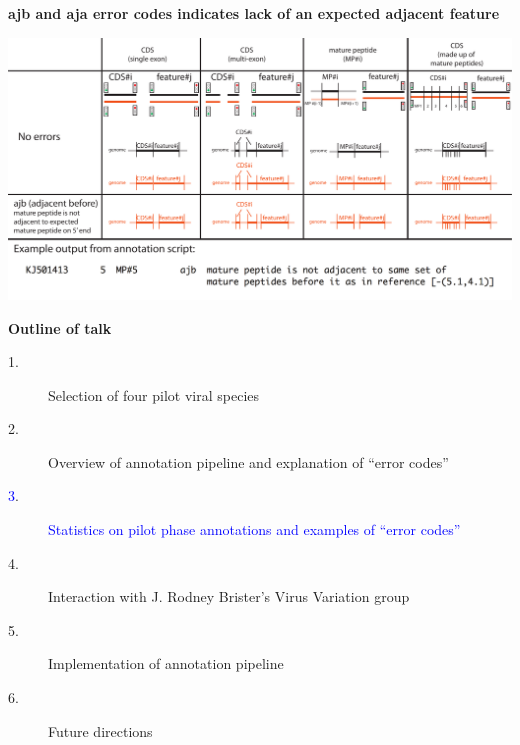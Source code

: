 \documentclass[landscape]{slides}
\begin{document}
\begin{slide}
\begin{center}
\textbf{ajb and aja error codes indicates lack of an expected adjacent feature}
\vspace{0.5in}

\includegraphics[width=10in]{figs/errornew-4-ajb}
\end{center}
\vfill
\end{slide}
\begin{slide}
\begin{center}
\textbf{Outline of talk}

\small
\begin{description}
\item[1.] Selection of four pilot viral species
\item[2.] Overview of annotation pipeline and explanation of ``error codes''
\item[\textcolor{blue}3.] \textcolor{blue}{Statistics on pilot phase annotations and examples of ``error codes''}
\item[4.] Interaction with J. Rodney Brister's Virus Variation group
\item[5.] Implementation of annotation pipeline
\item[6.] Future directions
\end{description}

\end{center}
\vfill
\end{slide}
\end{document}

